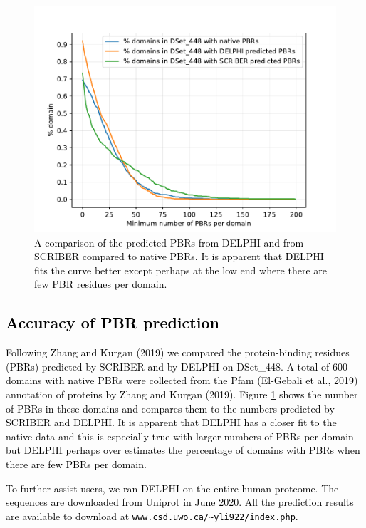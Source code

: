 \documentclass{bioinfo}
\newcommand{\mySecondColor}{black}
\begin{document}
\begin{figure}
\centering
\includegraphics[width=\columnwidth]{plot_DS448_domain.pdf}
  \caption{\textcolor{\mySecondColor}{A comparison of the predicted PBRs from DELPHI and from SCRIBER compared to native PBRs.  It is apparent that DELPHI fits the curve better except perhaps at the low end where there are few PBR residues per domain.} 
  \label{fig_plot_DS448_domain}}
\end{figure}


\subsection{\textcolor{\mySecondColor}{Accuracy of PBR prediction}}
\textcolor{\mySecondColor}{Following Zhang and Kurgan (2019) we compared the protein-binding residues (PBRs) predicted by SCRIBER and by DELPHI on DSet\_448.  
A total of 600 domains with native PBRs were collected from the Pfam (El-Gebali et al., 2019) annotation of proteins by Zhang and Kurgan (2019).  
Figure \ref{fig_plot_DS448_domain} shows the number of PBRs in these domains and compares them to the numbers predicted by SCRIBER and DELPHI. 
It is apparent that DELPHI has a closer fit to the native data and this is especially 
true with larger numbers of PBRs per domain but DELPHI perhaps over estimates the percentage of domains with PBRs when there are few PBRs per domain.}

\textcolor{\mySecondColor}{
To further assist users, we ran DELPHI on the entire human proteome. The sequences are downloaded from Uniprot in June 2020. All the prediction results are available to download at \texttt{www.csd.uwo.ca/\textasciitilde{}yli922/index.php}.
}
\end{document}
